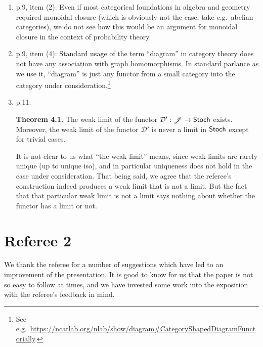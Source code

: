 \documentclass[11pt]{article}
\begin{document}
\begin{enumerate}[resume,label=(\alph*).]
	\item p.9, item (2): Even if most categorical foundations in algebra and geometry required monoidal closure (which is obviously not the case, take e.g.~abelian categories), we do not see how this would be an argument for monoidal closure in the context of probability theory.
	\item p.9, item (4): Standard usage of the term ``diagram'' in category theory does not have any association with graph homomorphisms. In standard parlance as we use it, ``diagram'' is just any functor from a small category into the category under consideration.\footnote{See e.g.~\href{https://ncatlab.org/nlab/show/diagram\#CategoryShapedDiagramFunctorially}{https://ncatlab.org/nlab/show/diagram\#CategoryShapedDiagramFunctorially}.}
	\item p.11:
		\begin{displayquote}
			\textbf{Theorem 4.1.} The weak limit of the functor $\mathcal{D}' : \mathscr{J} \to \operatorname{\mathsf{Stoch}}$ exists. Moreover, the weak limit of the functor $\mathcal{D}'$ is never a limit in $\operatorname{\mathsf{Stoch}}$ except for trivial cases.
		\end{displayquote}
		It is not clear to us what ``the weak limit'' means, since weak limits are rarely unique (up to unique iso), and in particular uniqueness does not hold in the case under consideration. That being said, we agree that the referee's construction indeed produces a weak limit that is not a limit. But the fact that that particular weak limit is not a limit says nothing about whether the functor has a limit or not.
\end{enumerate}

\section*{Referee 2}

We thank the referee for a number of suggestions which have led to an improvement of the presentation. It is good to know for us that the paper is not so easy to follow at times, and we have invested some work into the exposition with the referee's feedback in mind. 

%
%
\end{document}
